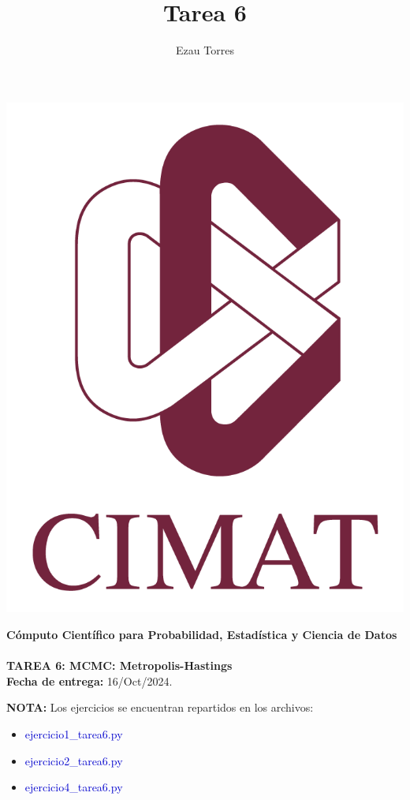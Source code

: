\documentclass[a4paper,12pt]{report}
\title{Tarea 6}
\author{Ezau Torres}
\begin{document}
	\begin{minipage}{0.15\textwidth}
		\centering
		\includegraphics[width=\textwidth]{IMAGENES/logo}
	\end{minipage}
	\begin{minipage}{0.85\textwidth}
		\centering
		\textbf{\large Cómputo Científico para Probabilidad, Estadística y Ciencia de Datos}\\
		\medskip
		 \\
		\medskip
		\textbf{\large TAREA 6: MCMC: Metropolis-Hastings}\\
		\medskip
		\textbf{Fecha de entrega:} 16/Oct/2024.
	\end{minipage}

\vspace{5mm}


\textcolor{BrickRed}{\bf NOTA:}  Los ejercicios se encuentran repartidos en los archivos:
\begin{itemize}
	\item \textcolor{mediumblue}{ejercicio1\_tarea6.py}
	\item \textcolor{mediumblue}{ejercicio2\_tarea6.py}
	\item \textcolor{mediumblue}{ejercicio4\_tarea6.py}
\end{itemize}


\end{document}
